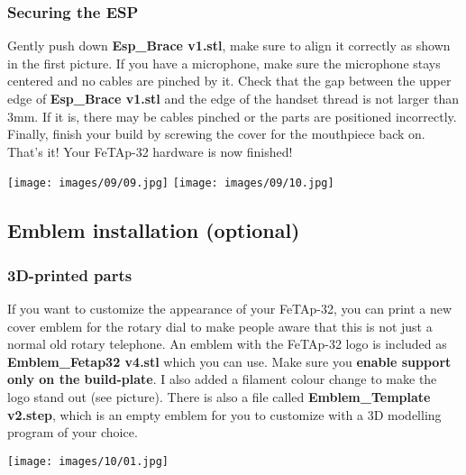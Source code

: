 \documentclass[]{article}
\begin{document}
\subsubsection{Securing the ESP}
\begin{minipage}[t]{0.4\linewidth}
	\vspace{0pt}
	Gently push down \textbf{Esp\_Brace v1.stl}, make sure to align it correctly as shown in the first picture.
	\newline
	\newline
	If you have a microphone, make sure the microphone stays centered and no cables are pinched by it. Check that the gap between the upper edge of \textbf{Esp\_Brace v1.stl} and the edge of the handset thread is not larger than 3mm. If it is, there may be cables pinched or the parts are positioned incorrectly.
	\newline
	\newline
	Finally, finish your build by screwing the cover for the mouthpiece back on. That's it! Your FeTAp-32 hardware is now finished!
\end{minipage}
\hfill
\begin{minipage}[t]{0.45\linewidth}
	\vspace{0pt}
	\texttt{[image: images/09/09.jpg]}
	\texttt{[image: images/09/10.jpg]}
\end{minipage}





\subsection{Emblem installation (optional)}
\subsubsection{3D-printed parts}
\begin{minipage}[t]{0.4\linewidth}
	\vspace{0pt}
	If you want to customize the appearance of your FeTAp-32, you can print a new cover emblem for the rotary dial to make people aware that this is not just a normal old rotary telephone.
	\newline
	\newline
	An emblem with the FeTAp-32 logo is included as \textbf{Emblem\_Fetap32 v4.stl} which you can use. Make sure you \textbf{enable support only on the build-plate}. I also added a filament colour change to make the logo stand out (see picture).
	\newline
	\newline
	There is also a file called \textbf{Emblem\_Template v2.step}, which is an empty emblem for you to customize with a 3D modelling program of your choice.
\end{minipage}
\hfill
\begin{minipage}[t]{0.5\linewidth}
	\vspace{0pt}
	\texttt{[image: images/10/01.jpg]}
\end{minipage}
\end{document}
